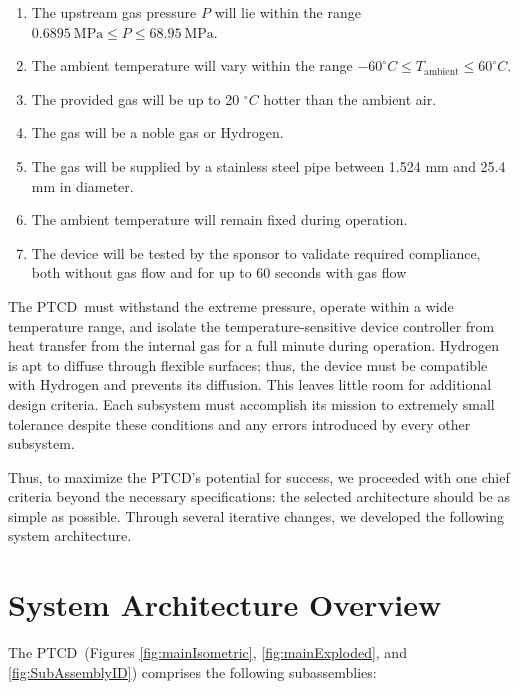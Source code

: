 \documentclass[12pt, letterpaper]{report}%
\newcounter{mycounter}           %
\newcounter{sub}[mycounter]      %
\newcommand{\device}{PTCD}
\newcommand{\degC}{^{\circ}C}    %
\newcommand{\specPressure}{68.95}%
\begin{document}
        \begin{enumerate}
            \item The upstream gas pressure $P$ will lie within the range $0.6895\ \text{MPa} \leq P \leq \specPressure\ \text{MPa}$.
            \item The ambient temperature will vary within the range $-60 \degC \leq T_{\text{ambient}} \leq 60 \degC$.
            \item The provided gas will be up to 20 $\degC$ hotter than the ambient air.
            \item The gas will be a noble gas or Hydrogen.
            \item The gas will be supplied by a stainless steel pipe between 1.524 mm and 25.4 mm in diameter.
            \item The ambient temperature will remain fixed during operation.
            \item The device will be tested by the sponsor to validate required compliance, both without gas flow and for up to 60 seconds with gas flow
        \end{enumerate} 
        
        The \device\ must withstand the extreme pressure, operate within a wide temperature range, 
        and isolate the temperature-sensitive device controller
        from heat transfer from the internal gas for a full minute during operation.
        Hydrogen is apt to diffuse through flexible surfaces; thus, the device must be compatible with Hydrogen and prevents its diffusion.
        This leaves little room for additional design criteria. Each subsystem must accomplish its mission to extremely small tolerance
        despite these conditions and any errors introduced by every other subsystem.
        
        Thus, to maximize the \device 's potential for success, we proceeded with one chief criteria beyond the necessary specifications:
        the selected architecture should be as simple as possible. Through several iterative changes,
        we developed the following system architecture.

    \section{System Architecture Overview}
    \label{sec:sys_arch_overview}
        
        The \device\ (Figures \ref{fig:mainIsometric}, \ref{fig:mainExploded}, and \ref{fig:SubAssemblyID})
        comprises the following subassemblies:
\end{document}
